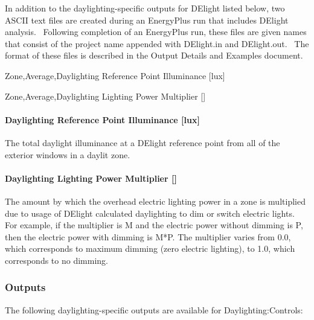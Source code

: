 In addition to the daylighting-specific outputs for DElight listed below, two ASCII text files are created during an EnergyPlus run that includes DElight analysis.~ Following completion of an EnergyPlus run, these files are given names that consist of the project name appended with DElight.in and DElight.out.~ The format of these files is described in the Output Details and Examples document.

Zone,Average,Daylighting Reference Point Illuminance {[}lux{]}

Zone,Average,Daylighting Lighting Power Multiplier {[]}

\paragraph{Daylighting Reference Point Illuminance {[}lux{]}}\label{daylighting-reference-point-illuminance-lux}

The total daylight illuminance at a DElight reference point from all of the exterior windows in a daylit zone.

\paragraph{\texorpdfstring{Daylighting Lighting Power Multiplier {[]}}{Daylighting Lighting Power Multiplier }}\label{daylighting-lighting-power-multiplier}

The amount by which the overhead electric lighting power in a zone is multiplied due to usage of DElight calculated daylighting to dim or switch electric lights. For example, if the multiplier is M and the electric power without dimming is P, then the electric power with dimming is M*P. The multiplier varies from 0.0, which corresponds to maximum dimming (zero electric lighting), to 1.0, which corresponds to no dimming.

\subsubsection{Outputs}\label{outputs-1-004}

The following daylighting-specific outputs are available for Daylighting:Controls:

